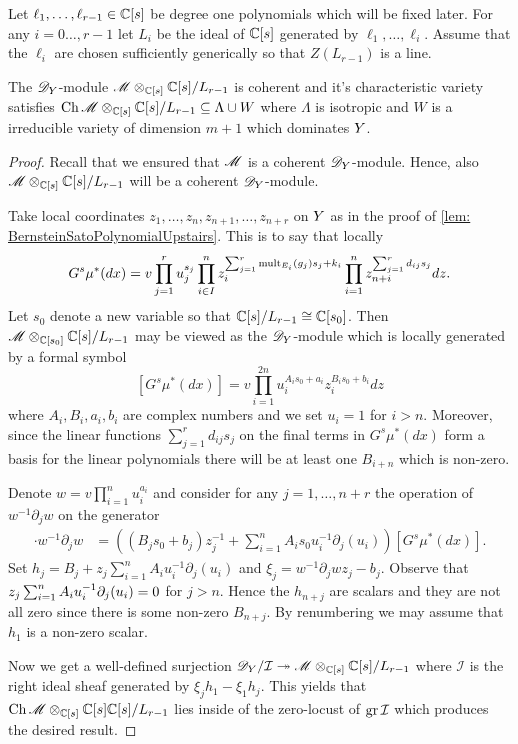 Let $\ell_1,\ldots,\ell_{r-1}\in \mathbb{C}[s]$ be degree one polynomials which will be fixed later.
For any $i=0\ldots,r-1$ let $L_i$ be the ideal of $\mathbb{C}[s]$ generated by $\ell_1,\ldots,\ell_i$.
Assume that the $\ell_i$ are chosen sufficiently generically so that $Z(L_{r-1})$ is a line.
\begin{lemma}\label{lem: CharVarEstimateW}
  The $\mathscr{D}_Y$-module $\mathscr{M}\otimes_{\mathbb{C}[s]}\mathbb{C}[s]/L_{r-1}$ is coherent and it's characteristic variety satisfies $\operatorname{Ch}\mathscr{M}\otimes_{\mathbb{C}[s]}\mathbb{C}[s]/L_{r-1} \subseteq \Lambda \cup W $ where $\Lambda$ is isotropic and $W$ is a irreducible variety of dimension $m +1$ which dominates $Y$.
\end{lemma}
\begin{proof}
  Recall that we ensured that $\mathscr{M}$ is a coherent $\mathscr{D}_Y$-module.
  Hence, also $\mathscr{M}\otimes_{\mathbb{C}[s]}\mathbb{C}[s]/L_{r-1}$ will be a coherent $\mathscr{D}_Y$-module.

  Take local coordinates $z_1,\ldots,z_n,z_{n+1},\ldots,z_{n+r}$ on $Y$ as in the proof of \cref{lem: BernsteinSatoPolynomialUpstairs}.
  This is to say that locally
  $$G^s \mu^*(dx) = v\prod_{j=1}^r u_j^{s_j} \prod_{i\in I}^nz_i^{\sum_{j=1}^r \operatorname{mult}_{E_i}(g_j) s_j + k_i}\prod_{i=1}^n z_{n+i}^{\sum_{j=1}^r d_{ij}s_j} dz.$$
  Let $s_0$ denote a new variable so that $\mathbb{C}[s]/L_{r-1}\cong \mathbb{C}[s_0]$.
  Then $\mathscr{M}\otimes_{\mathbb{C}[s_0]}\mathbb{C}[s]/L_{r-1}$ may be viewed as the $\mathscr{D}_Y$-module which is locally generated by a formal symbol
  $$[G^s \mu^*(dx)] =v \prod_{i=1}^{2n} u_i^{A_i s_0 + a_i}z_i^{B_i s_0 + b_i} dz $$
  where $A_i,B_i,a_i,b_i$ are complex numbers and we set $u_{i}=1$ for $i>n$.
  Moreover, since the linear functions $\sum_{j=1}^r d_{ij}s_j$ on the final terms in $G^s\mu^*(dx)$ form a basis for the linear polynomials there will be at least one $B_{i+n}$ which is non-zero.

  Denote $w = v\prod_{i=1}^n u_i^{a_i}$ and consider for any $j=1,\ldots,n+r$ the operation of $w^{-1}\partial_j w$ on the generator
  \begin{align*}
    [G^s \mu^*(dx)]\cdot w^{-1}\partial_j w &=((B_j s_0 + b_j)z_j^{-1} + \sum_{i=1}^{n} A_i s_0 u_i^{-1}\partial_j(u_i) )[G^s \mu^*(dx)].
  \end{align*}
  Set $h_j = B_j + z_j\sum_{i=1}^n A_iu_i^{-1}\partial_j(u_i)$ and $\xi_j= w^{-1}\partial_j wz_j - b_j$.
  Observe that $ z_j\sum_{i=1}^n A_iu_i^{-1}\partial_j(u_i) \allowbreak= 0$ for $j>n$.
  Hence the $h_{n+j}$ are scalars and they are not all zero since there is some non-zero $B_{n+j}$.
  By renumbering we may assume that $h_1$ is a non-zero scalar.

  Now we get a well-defined surjection $\mathscr{D}_Y/\mathcal{I}\twoheadrightarrow \mathscr{M} \otimes_{\mathbb{C}[s]}\mathbb{C}[s]/L_{r-1}$ where $\mathcal{I}$ is the right ideal sheaf generated by $\xi_j h_1 - \xi_1 h_j$.
  This yields that $\operatorname{Ch} \mathscr{M}\otimes_{\mathbb{C}[s]}\mathbb{C}[s]\mathbb{C}[s]/L_{r-1}$ lies inside of the zero-locust of $\operatorname{gr} \mathcal{I}$ which produces the desired result.
\end{proof}
